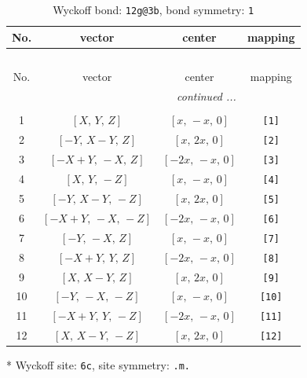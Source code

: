 \documentclass[fleqn,8pt]{jsarticle}
\begin{document}
\begin{longtable}{cccc}
\caption{Wyckoff bond: {\tt 12g@3b}, bond symmetry: {\tt 1}}
 \\
 \hline \hline
No. & vector & center & mapping \\ \hline \endfirsthead

\multicolumn{3}{l}{\tablename\ \thetable{}} \\
 \hline \hline
No. & vector & center & mapping \\ \hline \endhead

 \hline \hline
\multicolumn{3}{r}{\footnotesize\it continued ...} \\ \endfoot

 \hline \hline
\multicolumn{3}{r}{} \\ \endlastfoot

1 & $\left[ X,\, Y,\, Z \right]$ & $\left[ x,\, - x,\, 0 \right]$ & {\tt [1]} \\ \hline
2 & $\left[ - Y,\, X - Y,\, Z \right]$ & $\left[ x,\, 2 x,\, 0 \right]$ & {\tt [2]} \\ \hline
3 & $\left[ - X + Y,\, - X,\, Z \right]$ & $\left[ - 2 x,\, - x,\, 0 \right]$ & {\tt [3]} \\ \hline
4 & $\left[ X,\, Y,\, - Z \right]$ & $\left[ x,\, - x,\, 0 \right]$ & {\tt [4]} \\ \hline
5 & $\left[ - Y,\, X - Y,\, - Z \right]$ & $\left[ x,\, 2 x,\, 0 \right]$ & {\tt [5]} \\ \hline
6 & $\left[ - X + Y,\, - X,\, - Z \right]$ & $\left[ - 2 x,\, - x,\, 0 \right]$ & {\tt [6]} \\ \hline
7 & $\left[ - Y,\, - X,\, Z \right]$ & $\left[ x,\, - x,\, 0 \right]$ & {\tt [7]} \\ \hline
8 & $\left[ - X + Y,\, Y,\, Z \right]$ & $\left[ - 2 x,\, - x,\, 0 \right]$ & {\tt [8]} \\ \hline
9 & $\left[ X,\, X - Y,\, Z \right]$ & $\left[ x,\, 2 x,\, 0 \right]$ & {\tt [9]} \\ \hline
10 & $\left[ - Y,\, - X,\, - Z \right]$ & $\left[ x,\, - x,\, 0 \right]$ & {\tt [10]} \\ \hline
11 & $\left[ - X + Y,\, Y,\, - Z \right]$ & $\left[ - 2 x,\, - x,\, 0 \right]$ & {\tt [11]} \\ \hline
12 & $\left[ X,\, X - Y,\, - Z \right]$ & $\left[ x,\, 2 x,\, 0 \right]$ & {\tt [12]} \\
\end{longtable}
* Wyckoff site: {\tt 6c}, site symmetry: {\tt .m.}
\renewcommand{\arraystretch}{1.2}
\end{document}
